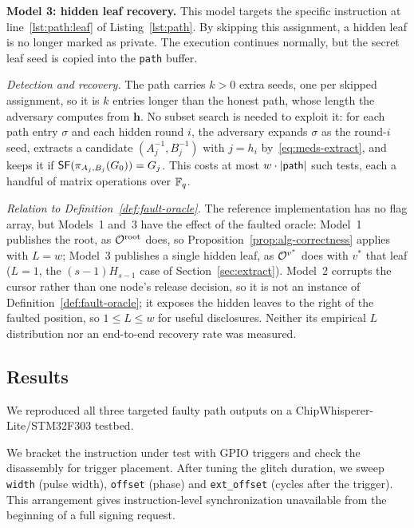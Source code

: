 \noindent\textbf{Model 3: hidden leaf recovery.}
This model targets the specific instruction  at line~\ref{lst:path:leaf} of Listing~\ref{lst:path}. By skipping this assignment, a hidden leaf is no longer marked as private. The execution continues normally, but the secret leaf seed is copied into the \texttt{path} buffer.

\noindent\textit{Detection and recovery.} The path carries $k > 0$ extra
seeds, one per skipped assignment, so it is $k$ entries longer than the honest
path, whose length the adversary computes from $\mathbf{h}$. No subset search
is needed to exploit it: for each path entry $\sigma$ and each hidden round
$i$, the adversary expands $\sigma$ as the round-$i$ seed, extracts a candidate
$(A_j^{-1},B_j^{-1})$ with $j = h_i$ by~\eqref{eq:meds-extract}, and keeps it
if $\mathsf{SF}(\pi_{A_j,B_j}(G_0)) = G_j$. This costs at most $w\cdot|\mathsf{path}|$
such tests, each a handful of matrix operations over $\mathbb{F}_q$.

\noindent\textit{Relation to Definition~\ref{def:fault-oracle}.} The
reference implementation has no flag array, but Models~1 and~3 have the effect
of the faulted oracle: Model~1 publishes the root, as $\mathcal{O}^{\mathrm{root}}$
does, so Proposition~\ref{prop:alg-correctness} applies with $L = w$; Model~3
publishes a single hidden leaf, as $\mathcal{O}^{v^*}$ does with $v^*$ that leaf
($L = 1$, the $(s-1)H_{s-1}$ case of Section~\ref{sec:extract}). Model~2
corrupts the cursor rather than one node's release decision, so it is not an
instance of Definition~\ref{def:fault-oracle}; it exposes the hidden leaves
to the right of the faulted position, so $1 \leq L \leq w$ for useful disclosures. Neither its empirical
$L$ distribution nor an end-to-end recovery rate was measured.

\subsection{Results}

We reproduced all three targeted faulty path outputs on a
ChipWhisperer-Lite/STM32F303 testbed.

We bracket the instruction under test with GPIO triggers and check the
disassembly for trigger placement. After tuning the glitch duration, we
sweep \texttt{width} (pulse width), \texttt{offset} (phase) and
\texttt{ext\_offset} (cycles after the trigger). This arrangement gives
instruction-level synchronization unavailable from the beginning of a full
signing request.


